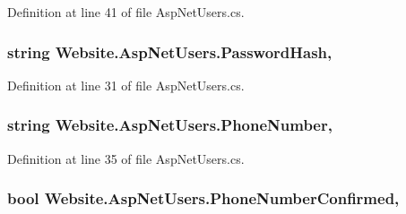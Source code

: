 Definition at line 41 of file Asp\+Net\+Users.\+cs.

\hypertarget{class_website_1_1_asp_net_users_abf72faae7687011e33ef5b4c8a2f4889}{}
\subsubsection[{Password\+Hash}]{\setlength{\rightskip}{0pt plus 5cm}string Website.\+Asp\+Net\+Users.\+Password\+Hash\hspace{0.3cm}{\ttfamily [get]}, {\ttfamily [set]}}\label{class_website_1_1_asp_net_users_abf72faae7687011e33ef5b4c8a2f4889}


Definition at line 31 of file Asp\+Net\+Users.\+cs.

\hypertarget{class_website_1_1_asp_net_users_aba86607f4f75287fc76623a22eb310ce}{}
\subsubsection[{Phone\+Number}]{\setlength{\rightskip}{0pt plus 5cm}string Website.\+Asp\+Net\+Users.\+Phone\+Number\hspace{0.3cm}{\ttfamily [get]}, {\ttfamily [set]}}\label{class_website_1_1_asp_net_users_aba86607f4f75287fc76623a22eb310ce}


Definition at line 35 of file Asp\+Net\+Users.\+cs.

\hypertarget{class_website_1_1_asp_net_users_a9f97a6f8698167bbc0105c3f9867227e}{}
\subsubsection[{Phone\+Number\+Confirmed}]{\setlength{\rightskip}{0pt plus 5cm}bool Website.\+Asp\+Net\+Users.\+Phone\+Number\+Confirmed\hspace{0.3cm}{\ttfamily [get]}, {\ttfamily [set]}}\label{class_website_1_1_asp_net_users_a9f97a6f8698167bbc0105c3f9867227e}


